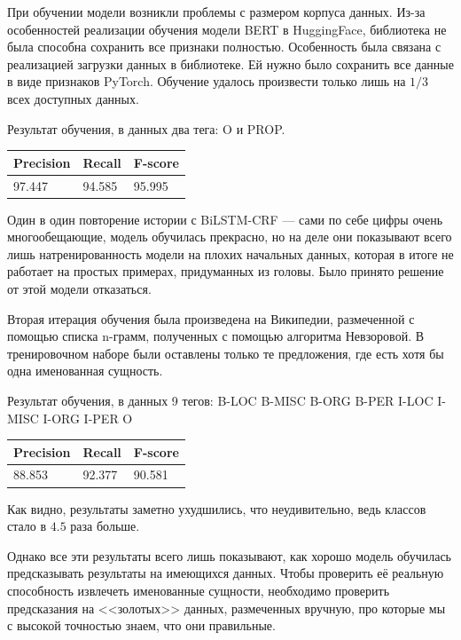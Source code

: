 При обучении модели возникли проблемы с размером корпуса данных. Из-за особенностей реализации обучения модели BERT в HuggingFace, библиотека не была способна сохранить все признаки полностью. Особенность была связана с реализацией загрузки данных в библиотеке. Ей нужно было сохранить все данные в виде признаков PyTorch. Обучение удалось произвести только лишь на $1/3$ всех доступных данных.

Результат обучения, в данных два тега: O и PROP.

\medskip

\begin{tabular}{| l | l | l |}
\hline
Precision  &   Recall   &  F-score     \\

\hline
97.447     & 94.585    & 95.995        \\
\hline
\end{tabular}

Один в один повторение истории с BiLSTM-CRF --- сами по себе цифры очень многообещающие, модель обучилась прекрасно, но на деле они показывают всего лишь натренированность модели на плохих начальных данных, которая в итоге не работает на простых примерах, придуманных из головы. Было принято решение от этой модели отказаться. %

Вторая итерация обучения была произведена на Википедии, размеченной с помощью списка n-грамм, полученных с помощью алгоритма Невзоровой. В тренировочном наборе были оставлены только те предложения, где есть хотя бы одна именованная сущность.

Результат обучения, в данных 9 тегов:
B-LOC
B-MISC
B-ORG
B-PER
I-LOC
I-MISC
I-ORG
I-PER
O

\begin{tabular}{| l | l | l |}
\hline
Precision  &   Recall   &  F-score     \\

\hline
88.853    & 92.377    & 90.581        \\
\hline
\end{tabular}
 

Как видно, результаты заметно ухудшились, что неудивительно, ведь классов стало в $4.5$ раза больше.

Однако все эти результаты всего лишь показывают, как хорошо модель обучилась предсказывать результаты на имеющихся данных. Чтобы проверить её реальную способность извлечеть именованные сущности, необходимо проверить предсказания на <<золотых>> данных, размеченных вручную, про которые мы с высокой точностью знаем, что они правильные.


